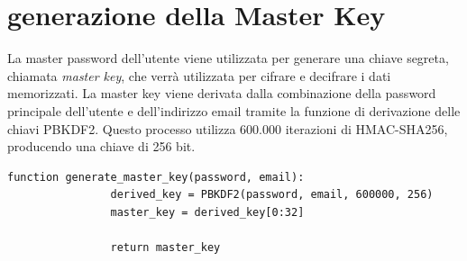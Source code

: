 \documentclass[a4paper,12pt]{report}
\begin{document}
		\section{generazione della Master Key}
		\sloppy
		La master password dell'utente viene utilizzata per generare una chiave
		segreta, chiamata \textit{master key}, che verrà utilizzata per cifrare
		e decifrare i dati memorizzati. La master key viene derivata dalla
		combinazione della password principale dell'utente e dell'indirizzo
		email tramite la funzione di derivazione delle chiavi PBKDF2. Questo
		processo utilizza 600.000 iterazioni di HMAC-SHA256, producendo una
		chiave di 256 bit.\\
		\begin{lstlisting}[style=pseudocode]
			function generate_master_key(password, email):
				derived_key = PBKDF2(password, email, 600000, 256)
				master_key = derived_key[0:32]
				
				return master_key
		\end{lstlisting}
\end{document}

